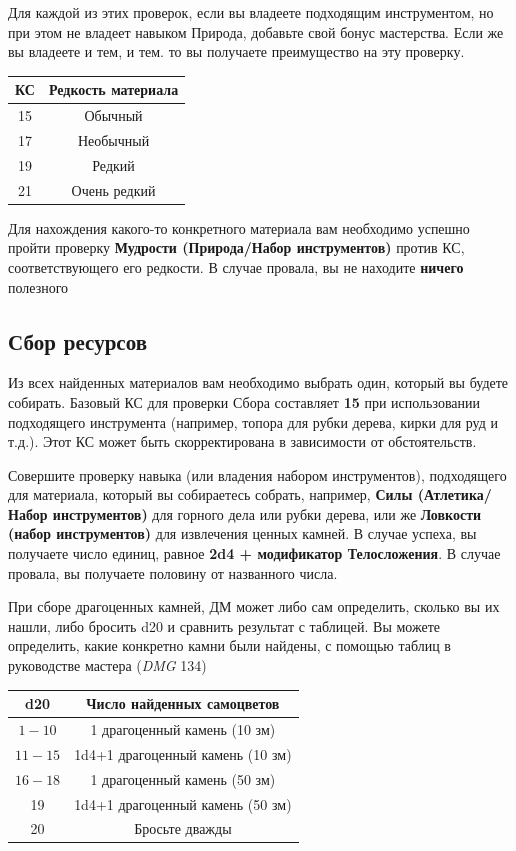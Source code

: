 \documentclass[a4paper, 9pt, twocolumn]{book}
\begin{document}
	Для каждой из этих проверок, если вы владеете подходящим инструментом, но при этом не владеет навыком Природа, добавьте свой бонус мастерства. Если же вы владеете и тем, и тем. то вы получаете преимущество на эту проверку.
	
	\begin{tabular}{|c|c|}
		\hline
		\textbf{КС} & \textbf{Редкость материала} \\
		\hline
		15 & Обычный \\
		\hline
		17 & Необычный \\
		\hline
		19 & Редкий \\
		\hline
		21 & Очень редкий \\
		\hline
	\end{tabular}
	
	Для нахождения какого-то конкретного материала вам необходимо успешно пройти проверку \textbf{Мудрости (Природа/Набор инструментов)} против КС, соответствующего его редкости. В случае провала, вы не находите \textbf{ничего} полезного
	
	\subsection{Сбор ресурсов}
	
	Из всех найденных материалов вам необходимо выбрать один, который вы будете собирать. Базовый КС для проверки Сбора составляет \textbf{15} при использовании подходящего инструмента (например, топора для рубки дерева, кирки для руд и т.д.). Этот КС может быть скорректирована в зависимости от обстоятельств.
	
	Совершите проверку навыка (или владения набором инструментов), подходящего для материала, который вы собираетесь собрать, например, \textbf{Силы (Атлетика/Набор инструментов)} для горного дела или рубки дерева, или же \textbf{Ловкости (набор инструментов)} для извлечения ценных камней. В случае успеха, вы получаете число единиц, равное \textbf{2d4 + модификатор Телосложения}. В случае провала, вы получаете половину от названного числа.
	
	При сборе драгоценных камней, ДМ может либо сам определить, сколько вы их нашли, либо бросить d20 и сравнить результат с таблицей. Вы можете определить, какие конкретно камни были найдены, с помощью таблиц в руководстве мастера (\textit{DMG} 134)
	
	\begin{tabular}{|c|c|}
		\hline
		\textbf{d20} & \textbf{Число найденных самоцветов} \\
		\hline
		$1-10$ & 1 драгоценный камень (10 зм) \\
		\hline
		$11-15$ & 1d4+1 драгоценный камень (10 зм) \\
		\hline
		$16-18$ & 1 драгоценный камень (50 зм) \\
		\hline
		19 & 1d4+1 драгоценный камень (50 зм) \\
		\hline
		20 & Бросьте дважды \\
		\hline
	\end{tabular}
	
\end{document}
